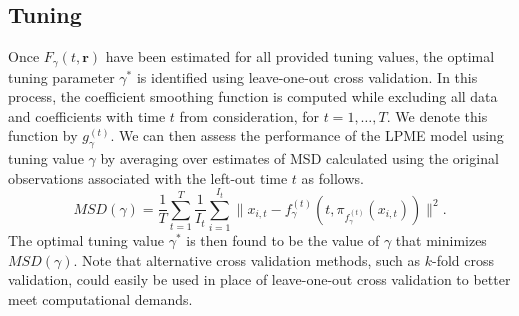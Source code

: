 \documentclass[11pt,reqno]{article}
\newcommand{\meng}[1]{{\color{purple} \sf $\clubsuit\clubsuit\clubsuit$ Kun Meng: [#1]}}
\theoremstyle{definition}
\begin{document}
\subsection*{Tuning}

Once $F_{\gamma}(t, \boldsymbol{r})$ have been estimated for all provided tuning values, the optimal tuning parameter $\gamma^*$ is identified using leave-one-out cross validation. In this process, the coefficient smoothing function is computed while excluding all data and coefficients with time $t$ from consideration, for $t = 1, \dots, T$. We denote this function by $g_{\gamma}^{(t)}$. We can then assess the performance of the LPME model using tuning value $\gamma$ by averaging over estimates of MSD calculated using the original observations associated with the left-out time $t$ as follows.
\begin{equation}
  MSD(\gamma) = \frac{1}{T} \sum_{t=1}^{T}\frac{1}{I_t}\sum_{i=1}^{I_t}\|x_{i, t} - f_{\gamma}^{(t)}(t, \pi_{f_{\gamma}^{(t)}}(x_{i, t}))\|^2. \label{eq:18}
\end{equation}
The optimal tuning value $\gamma^*$ is then found to be the value of $\gamma$ that minimizes $MSD(\gamma)$. Note that alternative cross validation methods, such as $k$-fold cross validation, could easily be used in place of leave-one-out cross validation to better meet computational demands.


\LinesNumbered


\LinesNumbered
\end{document}
